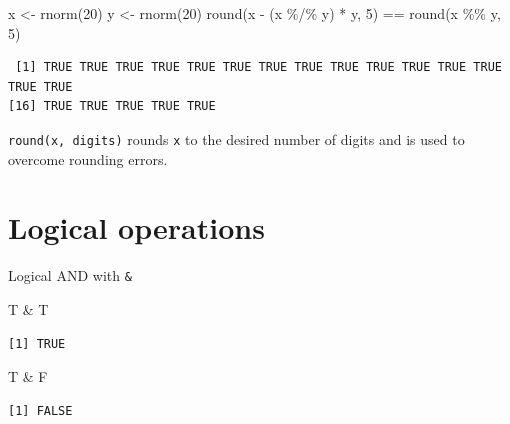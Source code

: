\documentclass[
]{book}
\makeatletter
\newenvironment{Shaded}{\begin{snugshade}}{\end{snugshade}}
\newcommand{\DecValTok}[1]{\textcolor[rgb]{0.00,0.00,0.81}{#1}}
\newcommand{\FunctionTok}[1]{\textcolor[rgb]{0.00,0.00,0.00}{#1}}
\newcommand{\NormalTok}[1]{#1}
\newcommand{\OtherTok}[1]{\textcolor[rgb]{0.56,0.35,0.01}{#1}}
\newcommand{\SpecialCharTok}[1]{\textcolor[rgb]{0.00,0.00,0.00}{#1}}
\newenvironment{kframe}{%
\medskip{}
\setlength{\fboxsep}{.8em}
 \def\at@end@of@kframe{}%
 \ifinner\ifhmode%
  \def\at@end@of@kframe{\end{minipage}}%
  \begin{minipage}{\columnwidth}%
 \fi\fi%
 \def\FrameCommand##1{\hskip\@totalleftmargin \hskip-\fboxsep
 \colorbox{shadecolor}{##1}\hskip-\fboxsep
     \hskip-\linewidth \hskip-\@totalleftmargin \hskip\columnwidth}%
 \MakeFramed {\advance\hsize-\width
   \@totalleftmargin\z@ \linewidth\hsize
   \@setminipage}}%
 {\par\unskip\endMakeFramed%
 \at@end@of@kframe}
\newenvironment{rmdblock}[1]
  {
  \begin{itemize}
  \renewcommand{\labelitemi}{
    \raisebox{-.7\height}[0pt][0pt]{
      {\setkeys{Gin}{width=3em,keepaspectratio}\texttt{[image: images/\#1]}}
    }
  }
  \setlength{\fboxsep}{1em}
  \begin{kframe}
  \item
  }
  {
  \end{kframe}
  \end{itemize}
  }
\newenvironment{info}
  {\begin{rmdblock}{info}}
  {\end{rmdblock}}
\makeatother
\begin{document}
\begin{Shaded}
\begin{Highlighting}[]
\NormalTok{x }\OtherTok{\textless{}{-}} \FunctionTok{rnorm}\NormalTok{(}\DecValTok{20}\NormalTok{)}
\NormalTok{y }\OtherTok{\textless{}{-}} \FunctionTok{rnorm}\NormalTok{(}\DecValTok{20}\NormalTok{)}
\FunctionTok{round}\NormalTok{(x }\SpecialCharTok{{-}}\NormalTok{ (x }\SpecialCharTok{\%/\%}\NormalTok{ y) }\SpecialCharTok{*}\NormalTok{ y, }\DecValTok{5}\NormalTok{) }\SpecialCharTok{==} \FunctionTok{round}\NormalTok{(x }\SpecialCharTok{\%\%}\NormalTok{ y, }\DecValTok{5}\NormalTok{)}
\end{Highlighting}
\end{Shaded}

\begin{verbatim}
 [1] TRUE TRUE TRUE TRUE TRUE TRUE TRUE TRUE TRUE TRUE TRUE TRUE TRUE TRUE TRUE
[16] TRUE TRUE TRUE TRUE TRUE
\end{verbatim}

\begin{info}
\texttt{round(x,\ digits)} rounds \texttt{x} to the desired number of
digits and is used to overcome rounding errors.
\end{info}

\hypertarget{logical-operations}{%
\section{Logical operations}\label{logical-operations}}

Logical AND with \texttt{\&}

\begin{Shaded}
\begin{Highlighting}[]
\NormalTok{T }\SpecialCharTok{\&}\NormalTok{ T}
\end{Highlighting}
\end{Shaded}

\begin{verbatim}
[1] TRUE
\end{verbatim}

\begin{Shaded}
\begin{Highlighting}[]
\NormalTok{T }\SpecialCharTok{\&}\NormalTok{ F}
\end{Highlighting}
\end{Shaded}

\begin{verbatim}
[1] FALSE
\end{verbatim}
\end{document}
